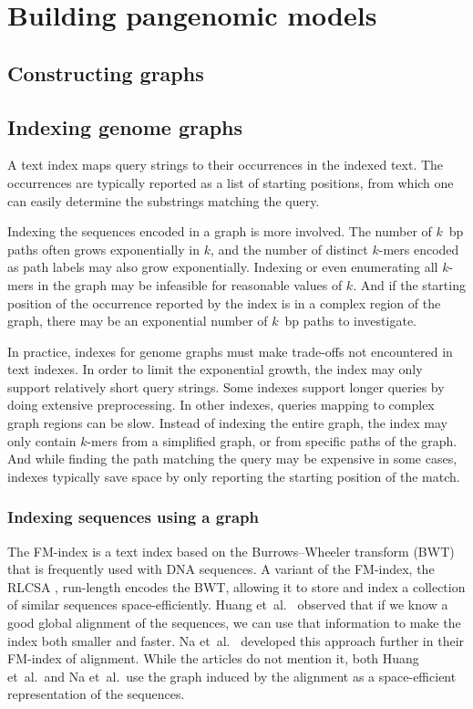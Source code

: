 \section{Building pangenomic models}

\subsection{Constructing graphs} 


\subsection{Indexing genome graphs}

A text index maps query strings to their occurrences in the indexed text. The occurrences are typically reported as a list of starting positions, from which one can easily determine the substrings matching the query.

Indexing the sequences encoded in a graph is more involved. The number of $k$~bp paths often grows exponentially in $k$, and the number of distinct $k$-mers encoded as path labels may also grow exponentially. Indexing or even enumerating all $k$-mers in the graph may be infeasible for reasonable values of $k$. And if the starting position of the occurrence reported by the index is in a complex region of the graph, there may be an exponential number of $k$~bp paths to investigate.

In practice, indexes for genome graphs must make trade-offs not encountered in text indexes. In order to limit the exponential growth, the index may only support relatively short query strings. Some indexes support longer queries by doing extensive preprocessing. In other indexes, queries mapping to complex graph regions can be slow. Instead of indexing the entire graph, the index may only contain $k$-mers from a simplified graph, or from specific paths of the graph. And while finding the path matching the query may be expensive in some cases, indexes typically save space by only reporting the starting position of the match.

\subsubsection{Indexing sequences using a graph}

The FM-index \cite{Ferragina_2005} is a text index based on the Burrows--Wheeler transform (BWT) \cite{Burrows_1994} that is frequently used with DNA sequences. A variant of the FM-index, the RLCSA \cite{Maekinen_2010}, run-length encodes the BWT, allowing it to store and index a collection of similar sequences space-efficiently. Huang et~al.\ \cite{Huang_2010} observed that if we know a good global alignment of the sequences, we can use that information to make the index both smaller and faster. Na et~al.\ \cite{Na_2016,Na_2018} developed this approach further in their FM-index of alignment. While the articles do not mention it, both Huang et~al.\ and Na et~al.\ use the graph induced by the alignment as a space-efficient representation of the sequences.

